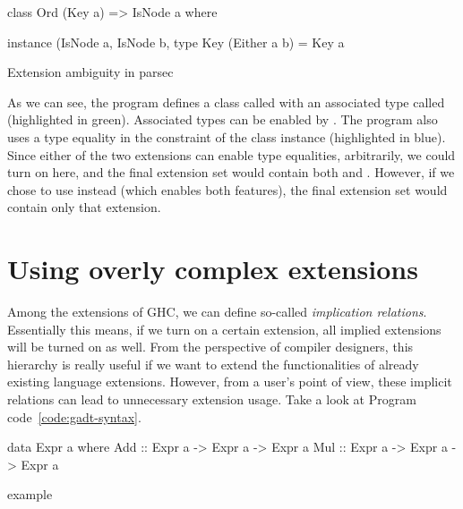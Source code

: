 \documentclass[main.tex]{subfiles}
\begin{document}
	\begin{codeFloat}
		\begin{haskell}
			class Ord (Key a) => IsNode a where
			
			instance (IsNode a, IsNode b, %
			type Key (Either a b) = Key a
		\end{haskell}
		\caption{Extension ambiguity in parsec}
		\label{code:ext-ambiguity-parsec}
	\end{codeFloat}
	
	As we can see, the program defines a class called  with an associated type called  (highlighted in green). Associated types can be enabled by . The program	also uses a type equality in the constraint of the  class instance (highlighted in blue). Since either of the two extensions can enable type equalities, arbitrarily, we could turn on  here, and the final extension set would contain both  and . However, if we chose to use  instead (which enables both features), the final extension set would contain only that extension.
	
	
	\section{Using overly complex extensions}
	
	Among the extensions of GHC, we can define so-called \emph{implication relations}. Essentially this means, if we turn on a certain extension, all implied extensions will be turned on as well. From the perspective of compiler designers, this hierarchy is really useful if we want to extend the functionalities of already existing language extensions. However, from a user's point of view, these implicit relations can lead to unnecessary extension usage. Take a look at Program code~\ref{code:gadt-syntax}.
	
	\begin{codeFloat}[H]
		\begin{haskell}
			data Expr a where
			Add :: Expr a -> Expr a -> Expr a
			Mul :: Expr a -> Expr a -> Expr a
		\end{haskell}
		\caption{ example}
		\label{code:gadt-syntax}
	\end{codeFloat}
	
\end{document}
